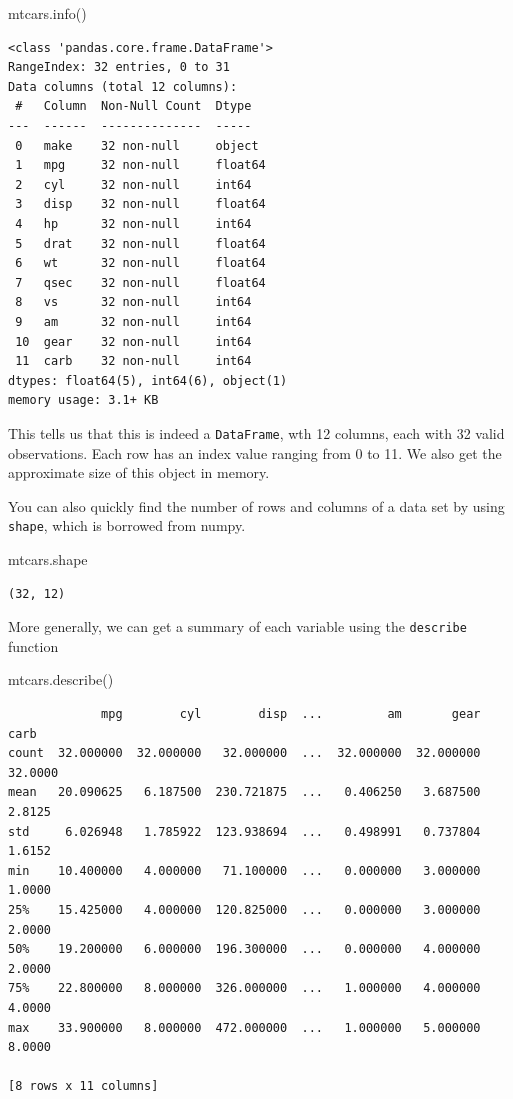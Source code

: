 \documentclass[
  letterpaper,
]{scrbook}
\newenvironment{Shaded}{\begin{snugshade}}{\end{snugshade}}
\newcommand{\NormalTok}[1]{#1}
\begin{document}
\begin{Shaded}
\begin{Highlighting}[]
\NormalTok{mtcars.info()}
\end{Highlighting}
\end{Shaded}

\begin{verbatim}
<class 'pandas.core.frame.DataFrame'>
RangeIndex: 32 entries, 0 to 31
Data columns (total 12 columns):
 #   Column  Non-Null Count  Dtype  
---  ------  --------------  -----  
 0   make    32 non-null     object 
 1   mpg     32 non-null     float64
 2   cyl     32 non-null     int64  
 3   disp    32 non-null     float64
 4   hp      32 non-null     int64  
 5   drat    32 non-null     float64
 6   wt      32 non-null     float64
 7   qsec    32 non-null     float64
 8   vs      32 non-null     int64  
 9   am      32 non-null     int64  
 10  gear    32 non-null     int64  
 11  carb    32 non-null     int64  
dtypes: float64(5), int64(6), object(1)
memory usage: 3.1+ KB
\end{verbatim}

This tells us that this is indeed a \texttt{DataFrame}, wth 12 columns, each with 32 valid observations. Each row has an index value ranging from 0 to 11. We also get the approximate size of this object in memory.

You can also quickly find the number of rows and columns of a data set by using \texttt{shape}, which is borrowed from numpy.

\begin{Shaded}
\begin{Highlighting}[]
\NormalTok{mtcars.shape}
\end{Highlighting}
\end{Shaded}

\begin{verbatim}
(32, 12)
\end{verbatim}

More generally, we can get a summary of each variable using the \texttt{describe} function

\begin{Shaded}
\begin{Highlighting}[]
\NormalTok{mtcars.describe()}
\end{Highlighting}
\end{Shaded}

\begin{verbatim}
             mpg        cyl        disp  ...         am       gear     carb
count  32.000000  32.000000   32.000000  ...  32.000000  32.000000  32.0000
mean   20.090625   6.187500  230.721875  ...   0.406250   3.687500   2.8125
std     6.026948   1.785922  123.938694  ...   0.498991   0.737804   1.6152
min    10.400000   4.000000   71.100000  ...   0.000000   3.000000   1.0000
25%    15.425000   4.000000  120.825000  ...   0.000000   3.000000   2.0000
50%    19.200000   6.000000  196.300000  ...   0.000000   4.000000   2.0000
75%    22.800000   8.000000  326.000000  ...   1.000000   4.000000   4.0000
max    33.900000   8.000000  472.000000  ...   1.000000   5.000000   8.0000

[8 rows x 11 columns]
\end{verbatim}
\end{document}
